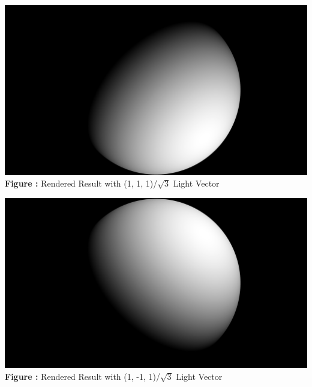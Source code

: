 \documentclass{article}
\begin{document}
	\begin{minipage}{0.31\linewidth}
	\centering
	\includegraphics[width=\linewidth]{./src/1b-a.png}
	\textbf{Figure \thefigure:} Rendered Result with (1, 1, 1)/$\sqrt{3}$ Light Vector  %
	\label{fig:Q1_b_a}         %
	\end{minipage}
\hfill
	\begin{minipage}{0.31\linewidth}
	\centering
	\includegraphics[width=\linewidth]{./src/1b-b.png}
	\textbf{Figure \thefigure:} Rendered Result with (1, -1, 1)/$\sqrt{3}$ Light Vector  %
	\label{fig:Q1_b_b}         %
	\end{minipage}	
\hfill
\end{document}
